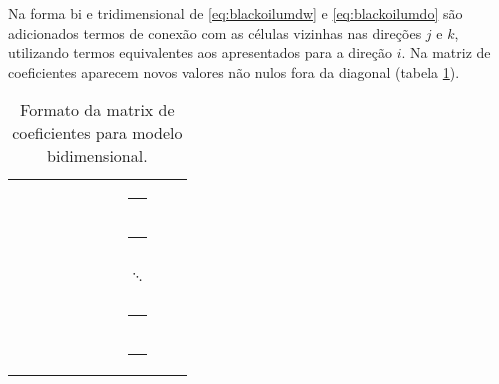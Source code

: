\documentclass[final,5p]{elsarticle}
\numberwithin{equation}{section}
\begin{document}
        Na forma bi e tridimensional de \ref{eq:blackoilumdw} e \ref{eq:blackoilumdo} são adicionados termos de conexão com as células vizinhas nas direções $j$ e $k$, utilizando termos equivalentes aos apresentados para a direção $i$. Na matriz de coeficientes aparecem novos valores não nulos fora da diagonal (tabela \ref{tab:bidimensional}).
        \begin{table}
            \centering
            \caption{Formato da matrix de coeficientes para modelo bidimensional.}
            \label{tab:bidimensional}
            \bigskip
            \renewcommand{\arraystretch}{0.8}
            \begin{tabularx}{0.35\textwidth}{|XXXXXXXXXX|}
                \textcolor{black}{\rule{0.5em}{0.5em}} & \textcolor{black}{\rule{0.5em}{0.5em}} & \textcolor{gray}{\rule{0.5em}{0.5em}}  & \textcolor{white}{\rule{0.5em}{0.5em}} & \textcolor{white}{\rule{0.5em}{0.5em}} & \textcolor{white}{\rule{0.5em}{0.5em}} & \textcolor{gray}{\rule{0.5em}{0.5em}}  & \textcolor{white}{\rule{0.5em}{0.5em}} & \textcolor{white}{\rule{0.5em}{0.5em}} & \textcolor{white}{\rule{0.5em}{0.5em}}  \\
                \textcolor{black}{\rule{0.5em}{0.5em}} & \textcolor{black}{\rule{0.5em}{0.5em}} & \textcolor{gray}{\rule{0.5em}{0.5em}}  & \textcolor{white}{\rule{0.5em}{0.5em}} & \textcolor{white}{\rule{0.5em}{0.5em}} & \textcolor{white}{\rule{0.5em}{0.5em}} & \textcolor{gray}{\rule{0.5em}{0.5em}}  & \textcolor{white}{\rule{0.5em}{0.5em}} & \textcolor{white}{\rule{0.5em}{0.5em}} & \textcolor{white}{\rule{0.5em}{0.5em}}  \\
                \textcolor{gray}{\rule{0.5em}{0.5em}}  & \textcolor{white}{\rule{0.5em}{0.5em}} & \textcolor{black}{\rule{0.5em}{0.5em}} & \textcolor{black}{\rule{0.5em}{0.5em}} & \textcolor{gray}{\rule{0.5em}{0.5em}}  & \textcolor{white}{\rule{0.5em}{0.5em}} & \textcolor{white}{\rule{0.5em}{0.5em}} &  $\ddots$                              & \textcolor{white}{\rule{0.5em}{0.5em}} & \textcolor{white}{\rule{0.5em}{0.5em}}  \\
                \textcolor{gray}{\rule{0.5em}{0.5em}}  & \textcolor{white}{\rule{0.5em}{0.5em}} & \textcolor{black}{\rule{0.5em}{0.5em}} & \textcolor{black}{\rule{0.5em}{0.5em}} & \textcolor{gray}{\rule{0.5em}{0.5em}}  & \textcolor{white}{\rule{0.5em}{0.5em}} & \textcolor{white}{\rule{0.5em}{0.5em}} & \textcolor{white}{\rule{0.5em}{0.5em}} & \textcolor{white}{\rule{0.5em}{0.5em}} & \textcolor{white}{\rule{0.5em}{0.5em}}  \\
                \textcolor{white}{\rule{0.5em}{0.5em}} & \textcolor{white}{\rule{0.5em}{0.5em}} & \textcolor{gray}{\rule{0.5em}{0.5em}}  & \textcolor{white}{\rule{0.5em}{0.5em}} & \textcolor{black}{\rule{0.5em}{0.5em}} & \textcolor{black}{\rule{0.5em}{0.5em}} & \textcolor{gray}{\rule{0.5em}{0.5em}}  & \textcolor{white}{\rule{0.5em}{0.5em}} & \textcolor{white}{\rule{0.5em}{0.5em}} & \textcolor{white}{\rule{0.5em}{0.5em}}  \\

\end{tabularx}
\end{table}
\end{document}
